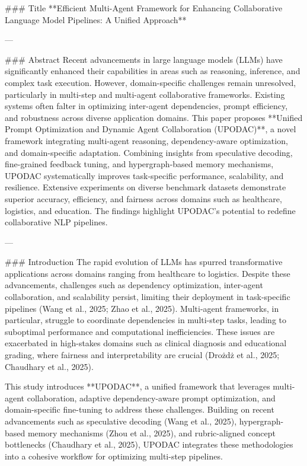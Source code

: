 ### Title  
**Efficient Multi-Agent Framework for Enhancing Collaborative Language Model Pipelines: A Unified Approach**

---

### Abstract  
Recent advancements in large language models (LLMs) have significantly enhanced their capabilities in areas such as reasoning, inference, and complex task execution. However, domain-specific challenges remain unresolved, particularly in multi-step and multi-agent collaborative frameworks. Existing systems often falter in optimizing inter-agent dependencies, prompt efficiency, and robustness across diverse application domains. This paper proposes **Unified Prompt Optimization and Dynamic Agent Collaboration (UPODAC)**, a novel framework integrating multi-agent reasoning, dependency-aware optimization, and domain-specific adaptation. Combining insights from speculative decoding, fine-grained feedback tuning, and hypergraph-based memory mechanisms, UPODAC systematically improves task-specific performance, scalability, and resilience. Extensive experiments on diverse benchmark datasets demonstrate superior accuracy, efficiency, and fairness across domains such as healthcare, logistics, and education. The findings highlight UPODAC's potential to redefine collaborative NLP pipelines.

---

### Introduction  
The rapid evolution of LLMs has spurred transformative applications across domains ranging from healthcare to logistics. Despite these advancements, challenges such as dependency optimization, inter-agent collaboration, and scalability persist, limiting their deployment in task-specific pipelines (Wang et al., 2025; Zhao et al., 2025). Multi-agent frameworks, in particular, struggle to coordinate dependencies in multi-step tasks, leading to suboptimal performance and computational inefficiencies. These issues are exacerbated in high-stakes domains such as clinical diagnosis and educational grading, where fairness and interpretability are crucial (Drożdż et al., 2025; Chaudhary et al., 2025).

This study introduces **UPODAC**, a unified framework that leverages multi-agent collaboration, adaptive dependency-aware prompt optimization, and domain-specific fine-tuning to address these challenges. Building on recent advancements such as speculative decoding (Wang et al., 2025), hypergraph-based memory mechanisms (Zhou et al., 2025), and rubric-aligned concept bottlenecks (Chaudhary et al., 2025), UPODAC integrates these methodologies into a cohesive workflow for optimizing multi-step pipelines.

